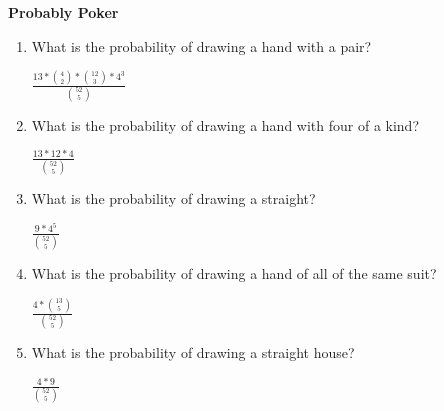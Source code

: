 \question \textbf{Probably Poker}
\begin{enumerate}[label=(\alph*)]
\item What is the probability of drawing a hand with a pair?
\begin{solution}[2cm]
$ \frac{13 * {4 \choose 2} * {12 \choose 3} * 4^3}{{52 \choose 5}}$ 
\end{solution}
 
\item What is the probability of drawing a hand with four of a kind?
\begin{solution}[2cm]
$\frac{ 13 * 12 * 4}{{52 \choose 5}}$
 \end{solution}
 
\item What is the probability of drawing a straight? 
\begin{solution}[2cm]
$\frac{ 9 * 4^5}{{52 \choose 5}}$
 \end{solution}
 
\item What is the probability of drawing a hand of all of the same suit? 
\begin{solution}[2cm]
$\frac{4 * {13 \choose 5}}{{52 \choose 5}}$
 \end{solution}
 
\item What is the probability of drawing a straight house? 
\begin{solution}[2cm]
$\frac{4 * 9}{{52 \choose 5}}$
 \end{solution}
\end{enumerate}